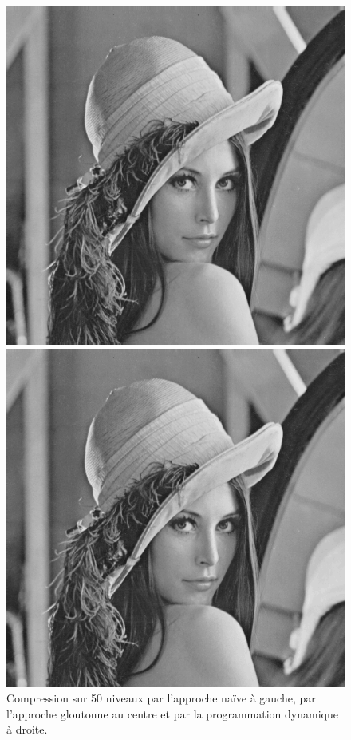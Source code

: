 \documentclass[a4paper, 12pt]{article}
\begin{document}
\begin{figure}[ht!]
\begin{minipage}[b]{0.3\linewidth}
    	    \includegraphics[scale=0.3]{resources/png/greedy50.png}
        \end{minipage}\hfill
        \begin{minipage}[b]{0.3\linewidth}
    	    \includegraphics[scale=0.3]{resources/png/dp50.png}
        \end{minipage}
        \caption{Compression sur 50 niveaux par l'approche naïve à gauche, par l'approche gloutonne au centre et par la programmation dynamique à droite.}
    \end{figure}
    
\end{document}
